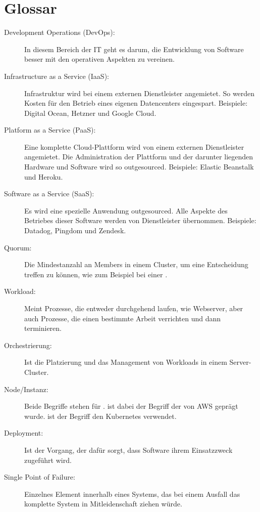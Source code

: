 \chapter{Glossar}
\label{ch:Glossar}

\begin{description}
  \item[Development Operations (DevOps): ]
  In diesem Bereich der IT geht es
  darum, die Entwicklung von Software besser mit den operativen Aspekten
  zu vereinen.

  \item[Infrastructure as a Service (IaaS): ] Infrastruktur wird bei einem externen
  Dienstleister angemietet. So werden Kosten f\"ur den Betrieb eines eigenen Datencenters
  eingespart. Beispiele: Digital Ocean, Hetzner und Google Cloud.

  \item[Platform as a Service (PaaS): ] Eine komplette Cloud-Plattform wird von einem
  externen Dienstleister angemietet. Die Administration der Plattform und der darunter
  liegenden Hardware und Software wird so
  outgesourced. Beispiele: Elastic Beanstalk und Heroku.

  \item[Software as a Service (SaaS): ] Es wird eine spezielle Anwendung outgesourced.
  Alle Aspekte des Betriebes dieser Software werden von Dienstleister \"ubernommen.
  Beispiele: Datadog, Pingdom und Zendesk.

  \item[Quorum: ] Die Mindestanzahl an Members in einem Cluster, um eine Entscheidung
  treffen zu k\"onnen, wie
  zum Beispiel bei einer .

  \item[Workload: ] Meint Prozesse, die entweder durchgehend laufen, wie Webserver,
  aber auch Prozesse, die einen bestimmte Arbeit verrichten und dann terminieren.

  \item[Orchestrierung: ] Ist die Platzierung und das Management von Workloads
  in einem Server-Cluster.

  \item[Node/Instanz: ] Beide Begriffe stehen f\"ur .
   ist dabei der Begriff der von AWS gepr\"agt wurde. 
  ist der Begriff den Kubernetes verwendet.

  \item[Deployment: ] Ist der Vorgang, der daf\"ur sorgt, dass Software
  ihrem Einsatzzweck zugef\"uhrt wird.

  \item[Single Point of Failure: ] Einzelnes Element innerhalb eines Systems,
  das bei einem Ausfall das komplette System in Mitleidenschaft ziehen w\"urde.

\end{description}
